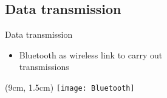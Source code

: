 \subsection{Data transmission}
\begin{frame}{Data transmission}
  \begin{itemize}
   \item Bluetooth as wireless link to carry out\\transmissions
  \end{itemize}
  
  \begin{textblock*}{5cm}(9cm, 1.5cm)
   \texttt{[image: Bluetooth]}
  \end{textblock*}


\end{frame}
